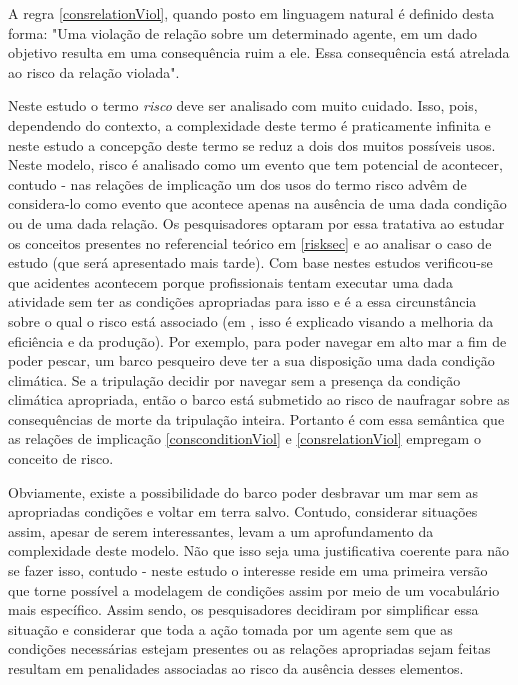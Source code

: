 A regra \ref{consrelationViol}, quando posto em linguagem natural é definido desta forma: "Uma violação de relação sobre um determinado agente, em um dado objetivo resulta em uma consequência ruim a ele. Essa consequência está atrelada ao risco da relação violada". 

Neste estudo o termo \textit{risco} deve ser analisado com muito cuidado. Isso, pois, dependendo do contexto, a complexidade deste termo é praticamente infinita e neste estudo a concepção deste termo se reduz a dois dos muitos possíveis usos. Neste modelo, risco é analisado como um evento que tem potencial de acontecer, contudo - nas relações de implicação um dos usos do termo risco advêm de considera-lo como evento que acontece apenas na ausência de uma dada condição ou de uma dada relação. Os pesquisadores optaram por essa tratativa ao estudar os conceitos presentes no referencial teórico em \ref{risksec} e ao analisar o caso de estudo (que será apresentado mais tarde). Com base nestes estudos verificou-se que acidentes acontecem porque profissionais tentam executar uma dada atividade sem ter as condições apropriadas para isso e é a essa circunstância sobre o qual o risco está associado (em \cite{safety}, isso é explicado visando a melhoria da eficiência e da produção). Por exemplo, para poder navegar em alto mar a fim de poder pescar, um barco pesqueiro deve ter a sua disposição uma dada condição climática. Se a tripulação decidir por navegar sem a presença da condição climática apropriada, então o barco está submetido ao risco de naufragar sobre as consequências de morte da tripulação inteira. Portanto é com essa semântica que as relações de implicação \ref{consconditionViol} e \ref{consrelationViol} empregam o conceito de risco. 

Obviamente, existe a possibilidade do barco poder desbravar um mar sem as apropriadas condições e voltar em terra salvo. Contudo, considerar situações assim, apesar de serem interessantes, levam a um aprofundamento da complexidade deste modelo. Não que isso seja uma justificativa coerente para não se fazer isso, contudo - neste estudo o interesse reside em uma primeira versão que torne possível a modelagem de condições assim por meio de um vocabulário mais específico. Assim sendo, os pesquisadores decidiram por simplificar essa situação e considerar que toda a ação tomada por um agente sem que as condições necessárias estejam presentes ou as relações apropriadas sejam feitas resultam em penalidades associadas ao risco da ausência desses elementos.  

